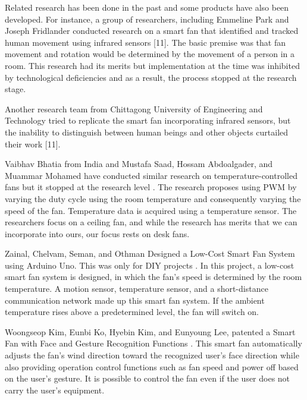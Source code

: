 Related research has been done in the past and some products have also been developed. For instance, a group of researchers, including Emmeline  Park and Joseph Fridlander conducted research on a smart fan that identified and tracked human movement using infrared sensors [11]. The basic premise was that fan movement and rotation would be determined by the movement of a person in a room. This research had its merits but implementation at the time was inhibited by technological deficiencies and as a result, the process stopped at the research stage.
\par
Another research team from Chittagong University of Engineering and Technology tried to replicate the smart fan incorporating infrared sensors, but the inability to distinguish between human beings and other objects curtailed their work [11]. 
\par
Vaibhav Bhatia from India and Mustafa Saad,  Hossam Abdoalgader, and Muammar Mohamed have conducted similar research on temperature-controlled fans but it stopped at the research level \cite{bhatia_room_nodate}. The research proposes using \ac{PWM} by varying the duty cycle using the room temperature and consequently varying the speed of the fan. Temperature data is acquired using a temperature sensor. The researchers focus on a ceiling fan, and while the research has merits that we can incorporate into ours, our focus rests on desk fans.
\par
Zainal, Chelvam, Seman, and Othman Designed a Low-Cost Smart Fan System using Arduino Uno. This was only for \ac{DIY} projects \cite{zainal_design_2019}. In this project, a low-cost smart fan system is designed, in which the fan's speed is determined by the room temperature. A motion sensor, temperature sensor, and a short-distance communication network made up this smart fan system. If the ambient temperature rises above a predetermined level, the fan will switch on.
\par
Woongseop Kim, Eunbi Ko, Hyebin Kim, and Eunyoung Lee, patented a Smart Fan with Face and Gesture Recognition Functions \cite{__2019}. This smart fan automatically adjusts the fan's wind direction toward the recognized user's face direction while also providing operation control functions such as fan speed and power off based on the user's gesture. It is possible to control the fan even if the user does not carry the user's equipment.
